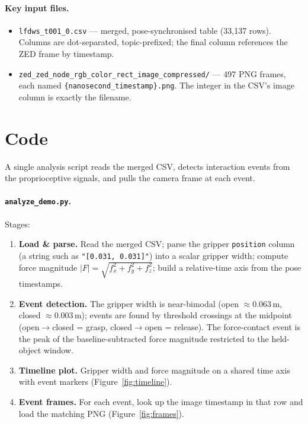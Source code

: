 \documentclass[11pt]{article}
\begin{document}
\paragraph{Key input files.}
\begin{itemize}[noitemsep]
  \item \texttt{lfdws\_t001\_0.csv} --- merged, pose-synchronised table
        (33{,}137 rows). Columns are dot-separated, topic-prefixed; the final
        column references the ZED frame by timestamp.
  \item \texttt{zed\_zed\_node\_rgb\_color\_\allowbreak rect\_image\_compressed/}
        --- 497 PNG frames, each named
        \texttt{\{nanosecond\_\allowbreak timestamp\}.png}. The integer in the
        CSV's image column is exactly the filename.
\end{itemize}

\section{Code}

A single analysis script reads the merged CSV, detects interaction events from
the proprioceptive signals, and pulls the camera frame at each event.

\paragraph{\texttt{analyze\_demo.py}.} Stages:
\begin{enumerate}[noitemsep]
  \item \textbf{Load \& parse.} Read the merged CSV; parse the gripper
        \texttt{position} column (a string such as \texttt{"[0.031, 0.031]"})
        into a scalar gripper width; compute force magnitude
        $|F|=\sqrt{f_x^2+f_y^2+f_z^2}$; build a relative-time axis from the
        pose timestamps.
  \item \textbf{Event detection.} The gripper width is near-bimodal
        (open $\approx 0.063$\,m, closed $\approx 0.003$\,m); events are found by
        threshold crossings at the midpoint (open$\to$closed = grasp,
        closed$\to$open = release). The force-contact event is the peak of the
        baseline-subtracted force magnitude restricted to the held-object window.
  \item \textbf{Timeline plot.} Gripper width and force magnitude on a shared
        time axis with event markers (Figure~\ref{fig:timeline}).
  \item \textbf{Event frames.} For each event, look up the image timestamp in
        that row and load the matching PNG (Figure~\ref{fig:frames}).
\end{enumerate}
\end{document}
